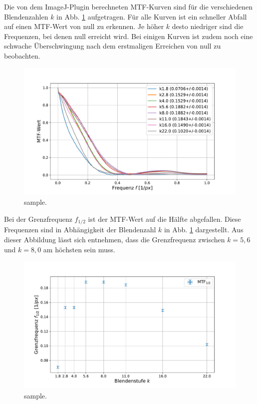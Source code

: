 		Die von dem ImageJ-Plugin berechneten MTF-Kurven sind für die verschiedenen Blendenzahlen $k$ in Abb. \ref{fig:kStufen} aufgetragen.
		Für alle Kurven ist ein schneller Abfall auf einen MTF-Wert von null zu erkennen.
		Je höher $k$ desto niedriger sind die Frequenzen, bei denen null erreicht wird.
		Bei einigen Kurven ist zudem noch eine schwache Überschwingung nach dem erstmaligen Erreichen von null zu beobachten.
		\begin{figure}[ht]
			\centering
			\includegraphics[width=1\textwidth]{data/kStufen.pdf}
			\caption{sample.}
			\label{fig:kStufen}	
		\end{figure}
		Bei der Grenzfrequenz $f_{1/2}$ ist der MTF-Wert auf die Hälfte abgefallen.
		Diese Frequenzen sind in Abhängigkeit der Blendenzahl $k$ in Abb. \ref{fig:kStufen} dargestellt.
		Aus dieser Abbildung lässt sich entnehmen, dass die Grenzfrequenz zwischen $k = 5,6$ und $k = 8,0$ am höchsten sein muss.
		\begin{figure}[ht]
			\centering
			\includegraphics[width=1\textwidth]{data/kHalbe.pdf}
			\caption{sample.}
			\label{fig:kHalbe}	
		\end{figure}
	
